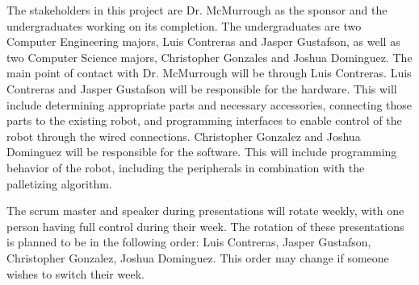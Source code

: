 The stakeholders in this project are Dr. McMurrough as the sponsor and the undergraduates working on its completion. The undergraduates are two Computer Engineering majors, Luis Contreras and Jasper Gustafson, as well as two Computer Science majors, Christopher Gonzales and Joshua Dominguez. The main point of contact with Dr. McMurrough will be through Luis Contreras. Luis Contreras and Jasper Gustafson will be responsible for the hardware. This will include determining appropriate parts and necessary accessories, connecting those parts to the existing robot, and programming interfaces to enable control of the robot through the wired connections. Christopher Gonzalez and Joshua Dominguez will be responsible for the software. This will include programming behavior of the robot, including the peripherals in combination with the palletizing algorithm.

The scrum master and speaker during presentations will rotate weekly, with one person having full control during their week. The rotation of these presentations is planned to be in the following order: Luis Contreras, Jasper Gustafson, Christopher Gonzalez, Joshua Dominguez. This order may change if someone wishes to switch their week.